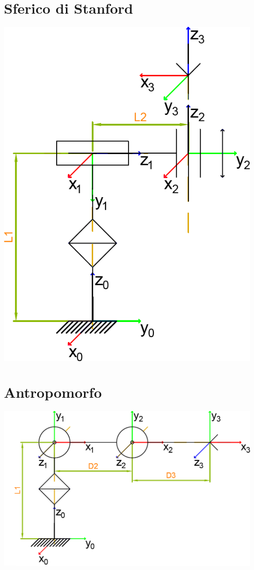 \documentclass[a4paper,11pt]{article}
\begin{document}
\section*{Sferico di Stanford}
\includegraphics{Sorgenti/Strutture/SfericoStanford.png}


\section*{Antropomorfo}
\includegraphics{Sorgenti/Strutture/Antropomorfo.png}

\end{document}
